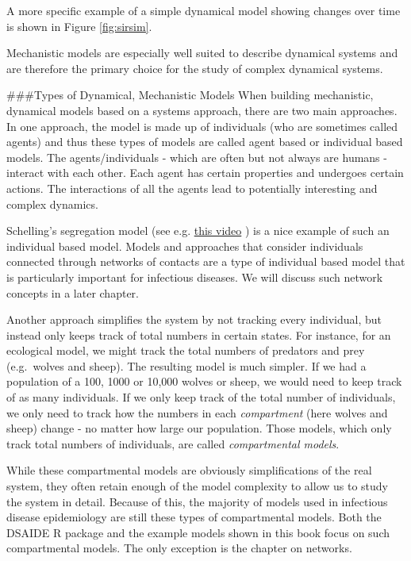 \documentclass[]{book}
\theoremstyle{definition}
\theoremstyle{definition}
\theoremstyle{definition}
\theoremstyle{remark}
\begin{document}
A more specific example of a simple dynamical model showing changes over
time is shown in Figure \ref{fig:sirsim}.

Mechanistic models are especially well suited to describe dynamical
systems and are therefore the primary choice for the study of complex
dynamical systems.

\#\#\#Types of Dynamical, Mechanistic Models When building mechanistic,
dynamical models based on a systems approach, there are two main
approaches. In one approach, the model is made up of individuals (who
are sometimes called agents) and thus these types of models are called
agent based or individual based models. The agents/individuals - which
are often but not always are humans - interact with each other. Each
agent has certain properties and undergoes certain actions. The
interactions of all the agents lead to potentially interesting and
complex dynamics.

Schelling's segregation model (see e.g.
\href{https://youtu.be/dFl3Cfw12bo}{this video} ) is a nice example of
such an individual based model. Models and approaches that consider
individuals connected through networks of contacts are a type of
individual based model that is particularly important for infectious
diseases. We will discuss such network concepts in a later chapter.

Another approach simplifies the system by not tracking every individual,
but instead only keeps track of total numbers in certain states. For
instance, for an ecological model, we might track the total numbers of
predators and prey (e.g.~wolves and sheep). The resulting model is much
simpler. If we had a population of a 100, 1000 or 10,000 wolves or
sheep, we would need to keep track of as many individuals. If we only
keep track of the total number of individuals, we only need to track how
the numbers in each \emph{compartment} (here wolves and sheep) change -
no matter how large our population. Those models, which only track total
numbers of individuals, are called \emph{compartmental models}.

While these compartmental models are obviously simplifications of the
real system, they often retain enough of the model complexity to allow
us to study the system in detail. Because of this, the majority of
models used in infectious disease epidemiology are still these types of
compartmental models. Both the DSAIDE R package and the example models
shown in this book focus on such compartmental models. The only
exception is the chapter on networks.
\end{document}

